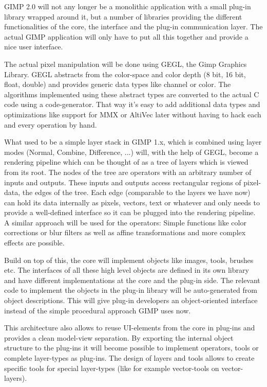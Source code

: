 GIMP 2.0 will not any longer be a monolithic application with a small plug-in library wrapped around it, but a number of libraries providing the different functionalities of the core, the interface and the plug-in communication layer. The actual GIMP application will only have to put all this together and provide a nice user interface. 


The actual pixel manipulation will be done using GEGL, the Gimp Graphics Library. GEGL abstracts from the color-space and color depth (8 bit, 16 bit, float, double) and provides generic data types like channel or color. The algorithms implemented using these abstract types are converted to the actual C code using a code-generator. That way it's easy to add additional data types and optimizations like support for MMX or AltiVec later without having to hack each and every operation by hand. 

 
What used to be a simple layer stack in GIMP 1.x, which is combined using layer modes (Normal, Combine, Difference, ...) will, with the help of GEGL, become a rendering pipeline which can be thought of as a tree of layers which is viewed from its root. The nodes of the tree are operators with an arbitrary number of inputs and outputs. These inputs and outputs access rectangular regions of pixel-data, the edges of the tree. Each edge (comparable to the layers we have now) can hold its data internally as pixels, vectors, text or whatever and only needs to provide a well-defined interface so it can be plugged into the rendering pipeline. A similar approach will be used for the operators: Simple functions like color corrections or blur filters as well as affine transformations and more complex effects are possible. 

 
Build on top of this, the core will implement objects like images, tools, brushes etc. The interfaces of all these high level objects are defined in its own library and have different implementations at the core and the plug-in side. The relevant code to implement the objects in the plug-in library will be auto-generated from object descriptions. This will give plug-in developers an object-oriented interface instead of the simple procedural approach GIMP uses now. 


This architecture also allows to reuse UI-elements from the core in plug-ins and provides a clean model-view separation. By exporting the internal object structure to the plug-ins it will become possible to implement operators, tools or complete layer-types as plug-ins. The design of layers and tools allows to create specific tools for special layer-types (like for example vector-tools on vector-layers). 


